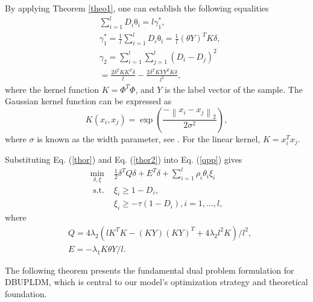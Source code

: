 \documentclass[a4paper]{cas-sc}
\begin{document}
By applying Theorem \ref{theo1}, one can establish the following equalities
\begin{equation}
\label{thor2}
\begin{aligned}
&\sum_{i=1}^{l} {D}_{i}\mathrm{\theta_i} =l \gamma_{1}^*, \\
&\gamma_{1}^* =\frac{1}{l} \sum_{i=1}^{l} {D}_{i}\mathrm{\theta_i}=\frac{1}{l} (\mathbb{\theta}Y)^{T} K \delta, \\
&\gamma_{2} =\sum_{i=1}^{l} \sum_{j=1}^{l}\left(D_{i}-D_{j}\right)^{2} \\
&=\frac{2 \delta^{T} K K^{T} \delta}{l}-\frac{2 \delta^{T} K Y Y^{T} K \delta}{l^{2}},
\end{aligned}
\end{equation}
where the kernel function $K = {\Phi^T}\Phi$, and $Y$ is the label vector of the sample. The Gaussian kernel function can be expressed as
\begin{equation}
\label{gaosikenl}
K\left(x_{i}, x_{j}\right)=\exp \left(\frac{-\left\|x_{i}-x_{j}\right\|_{2}}{2 \sigma^{2}}\right),
\end{equation}
where $\sigma$ is known as the width parameter, see \citep{scholkopf2002learning}. For the linear kernel, $K = x_{i}^{T} x_{j}$. 



Substituting Eq. (\ref{thor}) and Eq. (\ref{thor2}) into Eq. (\ref{qpp}) gives
\begin{equation}
\label{matrix}
\begin{aligned}
\min _{\delta, \xi} & \frac{1}{2} \delta^{T} Q \delta+E^{T} \delta+\sum_{i=1}^{l} \rho_{i}\theta_{i}  \xi_{i} \\
\text { s.t. } & \xi_{i} \geq 1-D_{i}, \\
& \xi_{i} \geq-\tau\left(1-D_{i}\right), i=1, \ldots, l,
\end{aligned}
\end{equation}
where 
\begin{equation}
\label{computeQE}
\begin{aligned}
&Q=4 \lambda_{2}\left(l K^{T} K-(K Y)(K Y)^{T}+4 \lambda_{2} l^{2} K\right) / l^{2}, \\
&E=-\lambda_{1} K\mathbb{\theta}Y / l.
\end{aligned}
\end{equation}

The following theorem presents the fundamental dual problem formulation for DBUPLDM, which is central to our model's optimization strategy and theoretical foundation.
\end{document}
